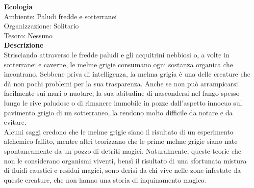 \begin{multicols}{2}
\textbf{Ecologia}\\
Ambiente: Paludi fredde e sotterranei\\
Organizzazione: Solitario\\
Tesoro: Nessuno\\
\textbf{Descrizione}\\
Strisciando attraverso le fredde paludi e gli acquitrini nebbiosi o, a volte in sotterranei e caverne, le melme grigie consumano ogni sostanza organica che incontrano. Sebbene priva di intelligenza, la melma grigia è una delle creature che dà non pochi problemi per la sua trasparenza. Anche se non può arrampicarsi facilmente sui muri o nuotare, la sua abitudine di nascondersi nel fango spesso lungo le rive paludose o di rimanere immobile in pozze dall'aspetto innocuo sul pavimento grigio di un sotterraneo, la rendono molto difficile da notare e da evitare.\\

Alcuni saggi credono che le melme grigie siano il risultato di un esperimento alchemico fallito, mentre altri teorizzano che le prime melme grigie siano nate spontaneamente da un pozzo di detriti magici. Naturalmente, queste teorie che non le considerano organismi viventi, bensì il risultato di una sfortunata mistura di fluidi caustici e residui magici, sono derisi da chi vive nelle zone infestate da queste creature, che non hanno una storia di inquinamento magico.\\


\end{multicols}
